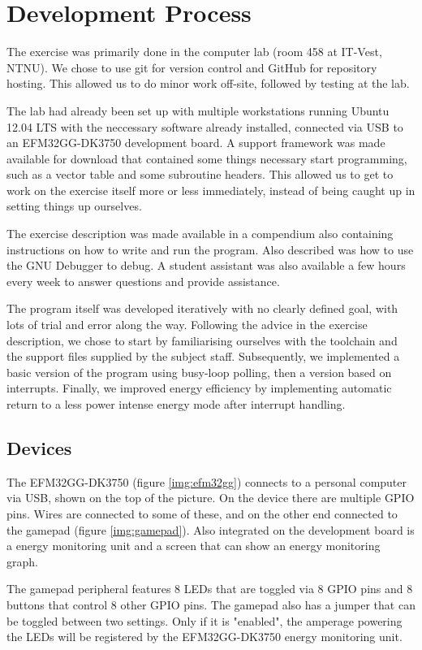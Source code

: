 \section{Development Process}
The exercise was primarily done in the computer lab (room 458 at IT-Vest, NTNU). We chose to use git for version control and GitHub for repository hosting. This allowed us to do minor work off-site, followed by testing at the lab.

The lab had already been set up with multiple workstations running Ubuntu 12.04 LTS with the neccessary software already installed, connected via USB to an EFM32GG-DK3750 development board. A support framework was made available for download that contained some things necessary start programming, such as a vector table and some subroutine headers. This allowed us to get to work on the exercise itself more or less immediately, instead of being caught up in setting things up ourselves.

The exercise description was made available in a compendium also containing instructions on how to write and run the program. Also described was how to use the GNU Debugger to debug. A student assistant was also available a few hours every week to answer questions and provide assistance.

The program itself was developed iteratively with no clearly defined goal, with lots of trial and error along the way. Following the advice in the exercise description, we chose to start by familiarising ourselves with the toolchain and the support files supplied by the subject staff. Subsequently, we implemented a basic version of the program using busy-loop polling, then a version based on interrupts. Finally, we improved energy efficiency by implementing automatic return to a less power intense energy mode after interrupt handling.

\subsection{Devices}
The EFM32GG-DK3750 (figure \ref{img:efm32gg}) connects to a personal computer via USB, shown on the top of the picture. On the device there are multiple GPIO pins. Wires are connected to some of these, and on the other end connected to the gamepad (figure \ref{img:gamepad}). Also integrated on the development board is a energy monitoring unit and a screen that can show an energy monitoring graph.

The gamepad peripheral features 8 LEDs that are toggled via 8 GPIO pins and 8 buttons that control 8 other GPIO pins. The gamepad also has a jumper that can be toggled between two settings. Only if it is "enabled", the amperage powering the LEDs will be registered by the EFM32GG-DK3750 energy monitoring unit.

